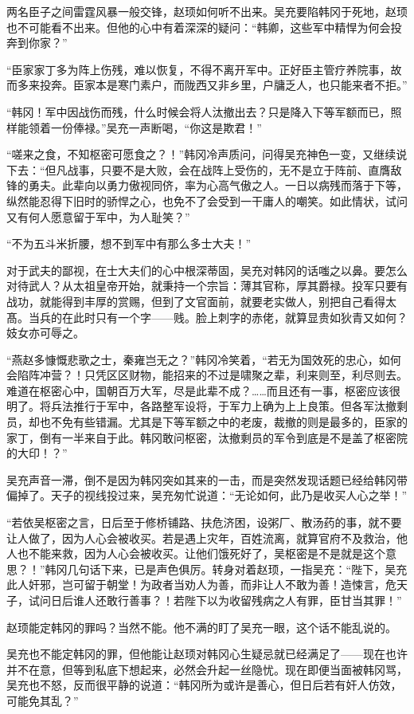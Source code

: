 两名臣子之间雷霆风暴一般交锋，赵顼如何听不出来。吴充要陷韩冈于死地，赵顼也不可能看不出来。但他的心中有着深深的疑问：“韩卿，这些军中精悍为何会投奔到你家？”

“臣家家丁多为阵上伤残，难以恢复，不得不离开军中。正好臣主管疗养院事，故而多来投奔。臣家本是寒门素户，而陇西又非乡里，户牗乏人，也只能来者不拒。”

“韩冈！军中因战伤而残，什么时候会将人汰撤出去？只是降入下等军额而已，照样能领着一份俸禄。”吴充一声断喝，“你这是欺君！”

“嗟来之食，不知枢密可愿食之？！”韩冈冷声质问，问得吴充神色一变，又继续说下去：“但凡战事，只要不是大败，会在战阵上受伤的，无不是立于阵前、直膺敌锋的勇夫。此辈向以勇力傲视同侪，率为心高气傲之人。一日以病残而落于下等，纵然能忍得下旧时的骄悍之心，也免不了会受到一干庸人的嘲笑。如此情状，试问又有何人愿意留于军中，为人耻笑？”

“不为五斗米折腰，想不到军中有那么多士大夫！”

对于武夫的鄙视，在士大夫们的心中根深蒂固，吴充对韩冈的话嗤之以鼻。要怎么对待武人？从太祖皇帝开始，就秉持一个宗旨：薄其官称，厚其爵禄。投军只要有战功，就能得到丰厚的赏赐，但到了文官面前，就要老实做人，别把自己看得太髙。当兵的在此时只有一个字——贱。脸上刺字的赤佬，就算显贵如狄青又如何？妓女亦可辱之。

“燕赵多慷慨悲歌之士，秦雍岂无之？”韩冈冷笑着，“若无为国效死的忠心，如何会陷阵冲营？！只凭区区财物，能招来的不过是啸聚之辈，利来则至，利尽则去。难道在枢密心中，国朝百万大军，尽是此辈不成？……而且还有一事，枢密应该很明了。将兵法推行于军中，各路整军设将，于军力上确为上上良策。但各军汰撤剩员，却也不免有些错漏。尤其是下等军额之中的老废，裁撤的则是最多的，臣家的家丁，倒有一半来自于此。韩冈敢问枢密，汰撤剩员的军令到底是不是盖了枢密院的大印！？”

吴充声音一滞，倒不是因为韩冈突如其来的一击，而是突然发现话题已经给韩冈带偏掉了。天子的视线投过来，吴充匆忙说道：“无论如何，此乃是收买人心之举！”

“若依吴枢密之言，日后至于修桥铺路、扶危济困，设粥厂、散汤药的事，就不要让人做了，因为人心会被收买。若是遇上灾年，百姓流离，就算官府不及救治，他人也不能来救，因为人心会被收买。让他们饿死好了，吴枢密是不是就是这个意思？！”韩冈几句话下来，已是声色俱厉。转身对着赵顼，一指吴充：“陛下，吴充此人奸邪，岂可留于朝堂！为政者当劝人为善，而非让人不敢为善！造悚言，危天子，试问日后谁人还敢行善事？！若陛下以为收留残病之人有罪，臣甘当其罪！”

赵顼能定韩冈的罪吗？当然不能。他不满的盯了吴充一眼，这个话不能乱说的。

吴充也不能定韩冈的罪，但他能让赵顼对韩冈心生疑忌就已经满足了——现在也许并不在意，但等到私底下想起来，必然会升起一丝隐忧。现在即便当面被韩冈骂，吴充也不怒，反而很平静的说道：“韩冈所为或许是善心，但日后若有奸人仿效，可能免其乱？”

